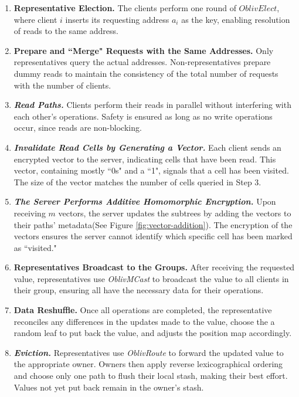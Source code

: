 \documentclass[fontsize=11pt]{article}
\begin{document}
\begin{enumerate}
    \item \textbf{Representative Election.} The clients perform one round of $OblivElect$, where client $i$ inserts its requesting address $a_i$ as the key, enabling resolution of reads to the same address.
    \item \textbf{Prepare and ``Merge" Requests with the Same Addresses.} Only representatives query the actual addresses. Non-representatives prepare dummy reads to maintain the consistency of the total number of requests with the number of clients.
    \item \textbf{\textit{Read Paths.}} Clients perform their reads in parallel without interfering with each other's operations. Safety is ensured as long as no write operations occur, since reads are non-blocking.
    \item \textbf{\textit{Invalidate Read Cells by Generating a Vector.}} Each client sends an encrypted vector to the server, indicating cells that have been read. This vector, containing mostly ``0s" and a ``1", signals that a cell has been visited. The size of the vector matches the number of cells queried in Step 3.
    \item \textbf{\textit{The Server Performs Additive Homomorphic Encryption.}} Upon receiving $m$ vectors, the server updates the subtrees by adding the vectors to their paths' metadata(See Figure \ref{fig:vector-addition}). The encryption of the vectors ensures the server cannot identify which specific cell has been marked as ``visited."
    \item \textbf{Representatives Broadcast to the Groups.} After receiving the requested value, representatives use \textit{OblivMCast} to broadcast the value to all clients in their group, ensuring all have the necessary data for their operations.
    \item \textbf{Data Reshuffle.} Once all operations are completed, the representative reconciles any differences in the updates made to the value, choose the a random leaf to put back the value, and adjusts the position map accordingly.
    \item \textbf{\textit{Eviction.}} Representatives use \textit{OblivRoute} to forward the updated value to the appropriate owner. Owners then apply reverse lexicographical ordering and choose only one path to flush their local stash, making their best effort. Values not yet put back remain in the owner’s stash.
\end{enumerate} 
\end{document}
